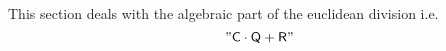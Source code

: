 This section deals with the algebraic part of the euclidean division i.e.
\[
	"\textsf{C} \cdot \textsf{Q} + \textsf{R}"
\]